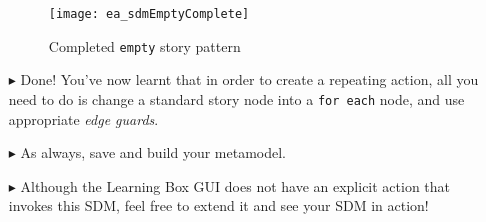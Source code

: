\begin{itemize}
\begin{figure}[htbp]
\begin{center}
  \texttt{[image: ea\_sdmEmptyComplete]}
  \caption{Completed \texttt{empty} story pattern}  
  \label{ea:sdm_end}
\end{center}
\end{figure}
\FloatBarrier

\item[$\blacktriangleright$] Done! You've now learnt that in order to create a repeating action, all you need to do is change a standard story node
into a \texttt{for each} node, and use appropriate \emph{edge guards}. 

\vspace{0.5cm}

\item[$\blacktriangleright$] As always, save and build your metamodel.

\vspace{0.5cm}

\item[$\blacktriangleright$] Although the Learning Box GUI does not have an explicit action that invokes this SDM, feel free to extend it and see your SDM in
action!

\end{itemize}

